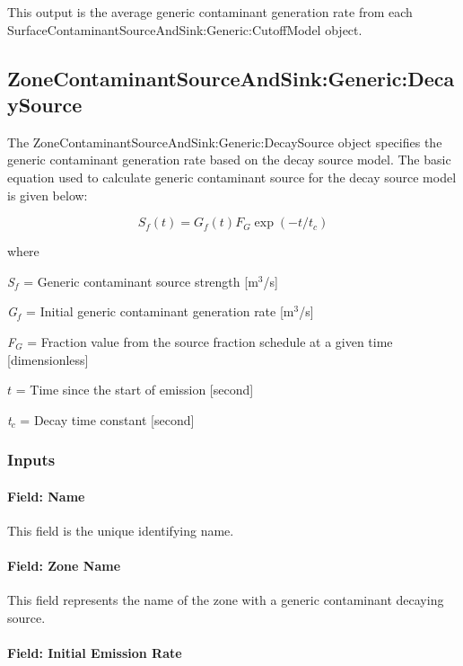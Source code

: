 This output is the average generic contaminant generation rate from each Surface\-Contaminant\-Source\-And\-Sink:\-Generic:\-Cutoff\-Model object.

\subsection{ZoneContaminantSourceAndSink:Generic:DecaySource}\label{zonecontaminantsourceandsinkgenericdecaysource}

The ZoneContaminantSourceAndSink:Generic:DecaySource object specifies the generic contaminant generation rate based on the decay source model. The basic equation used to calculate generic contaminant source for the decay source model is given below:

\begin{equation}
{S_f}(t) = {G_f}(t){F_G}\exp ( - t/{t_c})
\end{equation}

where

\emph{S\(_{f}\)} = Generic contaminant source strength {[}m\(^{3}\)/s{]}

\emph{G\(_{f}\)} = Initial generic contaminant generation rate {[}m\(^{3}\)/s{]}

\emph{F\(_{G}\)} = Fraction value from the source fraction schedule at a given time {[}dimensionless{]}

\(t\) = Time since the start of emission {[}second{]}

\emph{t\(_{c}\)} = Decay time constant {[}second{]}

\subsubsection{Inputs}\label{inputs-14-006}

\paragraph{Field: Name}\label{field-name-14-004}

This field is the unique identifying name.

\paragraph{Field: Zone Name}\label{field-zone-name-5-002}

This field represents the name of the zone with a generic contaminant decaying source.

\paragraph{Field: Initial Emission Rate}\label{field-initial-emission-rate}

